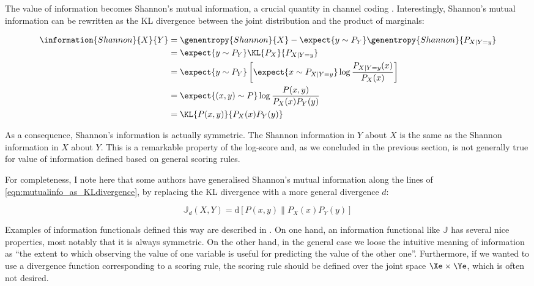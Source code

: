 The value of information becomes Shannon's mutual information, a crucial quantity in channel coding \citep{Shannon1948, MacKay2002}. Interestingly, Shannon's mutual information can be rewritten as the KL divergence between the joint distribution and the product of marginals:

\begin{align}
	\information{Shannon}{X}{Y} &= \genentropy{Shannon}{X} - \expect{y \sim P_{Y}} \genentropy{Shannon}{P_{X\vert Y=y}}\\
		&= \expect{y \sim P_{Y}}\KL{P_X}{P_{X\vert Y=y}}\\
		&= \expect{y \sim P_{Y}}\left[\expect{x \sim P_{X\vert Y=y}} \log\frac{P_{X\vert Y=y}(x)}{P_X(x)} \right]\\
		&= \expect{(x,y) \sim P} \log \frac{P(x,y)}{P_{X}(x)P_{Y}(y)}\\
		&= \KL{P(x,y)}{P_{X}(x)P_{Y}(y)}\label{eqn:mutualinfo_as_KLdivergence}
\end{align}

As a consequence, Shannon's information is actually symmetric. The Shannon information in $Y$ about $X$ is the same as the Shannon information in $X$ about $Y$. This is a remarkable property of the log-score and, as we concluded in the previous section, is not generally true for value of information defined based on general scoring rules.

For completeness, I note here that some authors have generalised Shannon's mutual information along the lines of \eqref{eqn:mutualinfo_as_KLdivergence}, by replacing the KL divergence with a more general divergence $d$:

\begin{equation}
	\mathbb{J}_{d}(X,Y) = \mbox{d}\left[ P(x,y) \middle\| P_{X}(x)P_{Y}(y) \right]\label{mutualinfo_generalisations}
\end{equation}

Examples of information functionals defined this way are described in \citep{Poczos2011}.
On one hand, an information functional like $\mathbb{J}$ has several nice properties, most notably that it is always symmetric. On the other hand, in the general case we loose the intuitive meaning of information as ``the extent to which observing the value of one variable is useful for predicting the value of the other one''. Furthermore, if we wanted to use a divergence function corresponding to a scoring rule, the scoring rule should be defined over the joint space $\Xe\times\Ye$, which is often not desired.

